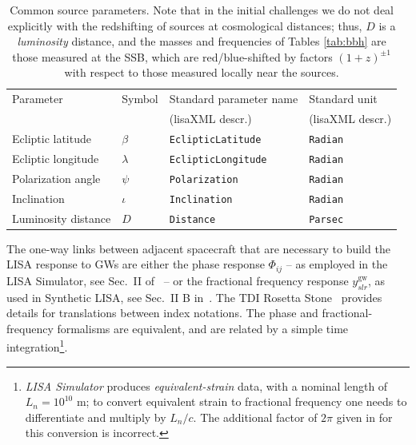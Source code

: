 \documentclass[12pt]{iopart}
\begin{document}
%
\begin{table}
\begin{tabular}{llll}
\hline
{Parameter} &
{Symbol} &
{Standard parameter name} &
{Standard unit} \\
& & (lisaXML descr.) & (lisaXML descr.) \\
\hline
Ecliptic latitude   & $\beta$   & \texttt{EclipticLatitude}  & \texttt{Radian} \\
Ecliptic longitude  & $\lambda$ & \texttt{EclipticLongitude} & \texttt{Radian} \\
Polarization angle  & $\psi$    & \texttt{Polarization}      & \texttt{Radian} \\
Inclination         & $\iota$   & \texttt{Inclination}       & \texttt{Radian} \\
Luminosity distance & $D$       & \texttt{Distance}          & \texttt{Parsec} \\
\hline
\end{tabular}
\caption{Common source parameters. Note that in the initial challenges we do not deal explicitly with the redshifting of sources at cosmological distances; thus, $D$ is a \emph{luminosity} distance, and the masses and frequencies of Tables \ref{tab:bbh} are those measured at the SSB, which are red/blue-shifted by factors $(1+z)^{\pm 1}$ with respect to those measured locally near the sources.\label{tab:common}}
\end{table}

The one-way links between adjacent spacecraft that are necessary to build the LISA response to GWs are either the phase response $\Phi_{ij}$ -- as employed in the LISA Simulator, see Sec.\ II of~\cite{lisasimulator} -- or the fractional frequency response $y^\mathrm{gw}_{slr}$, as used in Synthetic LISA, see Sec.\ II B in~\cite{synthlisa}. The TDI Rosetta Stone~\cite{rosetta} provides details for translations between index notations. The phase and fractional-frequency formalisms are equivalent, and are related by a simple time integration\footnote{\emph{LISA Simulator} produces \emph{equivalent-strain} data, with a nominal length of $L_n = 10^{10}$ m; to convert equivalent strain to fractional frequency one needs to differentiate and multiply by $L_n / c$. The additional factor of $2 \pi$ given in \cite{MLDCLISA06b} for this conversion is incorrect.}.
\end{document}
